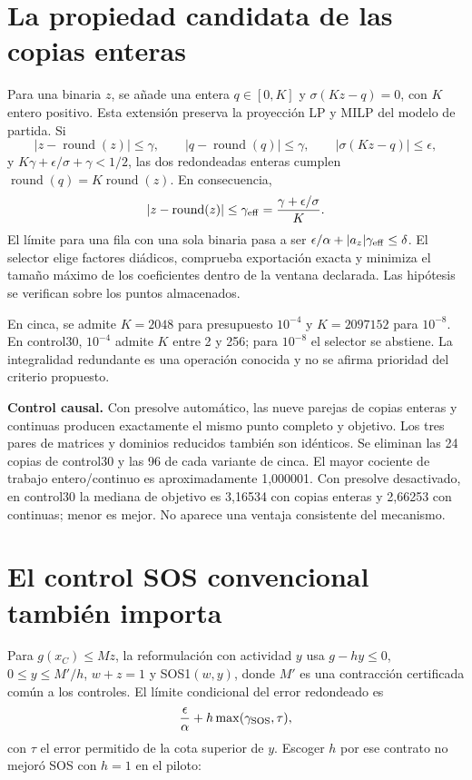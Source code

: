 \documentclass[10pt,a4paper]{article}
\begin{document}
\section*{La propiedad candidata de las copias enteras}
Para una binaria $z$, se añade una entera $q\in[0,K]$ y
$\sigma(Kz-q)=0$, con $K$ entero positivo. Esta extensión preserva la
proyección LP y MILP del modelo de partida. Si
\[
 |z-\operatorname{round}(z)|\leq\gamma,\qquad
 |q-\operatorname{round}(q)|\leq\gamma,\qquad
 |\sigma(Kz-q)|\leq\epsilon,
\]
y $K\gamma+\epsilon/\sigma+\gamma<1/2$, las dos redondeadas enteras cumplen
$\operatorname{round}(q)=K\operatorname{round}(z)$. En consecuencia,
\[
 |z-\operatorname{round}(z)|\leq
 \gamma_{\rm eff}=\frac{\gamma+\epsilon/\sigma}{K}.
\]
El límite para una fila con una sola binaria pasa a ser
$\epsilon/\alpha+|a_z|\gamma_{\rm eff}\leq\delta$.
El selector elige factores diádicos, comprueba exportación exacta y minimiza
el tamaño máximo de los coeficientes dentro de la ventana declarada.
Las hipótesis se verifican sobre los puntos almacenados.

En cinca, se admite $K=2048$ para presupuesto $10^{-4}$ y $K=2097152$
para $10^{-8}$. En control30, $10^{-4}$ admite $K$ entre 2 y 256; para
$10^{-8}$ el selector se abstiene. La integralidad redundante es una operación
conocida y no se afirma prioridad del criterio propuesto.

\textbf{Control causal.} Con presolve automático, las nueve parejas de
copias enteras y continuas producen exactamente el mismo punto completo y
objetivo. Los tres pares de matrices y dominios reducidos también son
idénticos. Se eliminan las 24 copias de control30 y las 96 de cada variante
de cinca. El mayor cociente de trabajo entero/continuo es aproximadamente
1,000001. Con presolve desactivado, en control30 la mediana de objetivo es
3,16534 con copias enteras y 2,66253 con continuas; menor es mejor.
No aparece una ventaja consistente del mecanismo.

\section*{El control SOS convencional también importa}
Para $g(x_C)\leq Mz$, la reformulación con actividad $y$ usa
$g-hy\leq0$, $0\leq y\leq M'/h$, $w+z=1$ y SOS1$(w,y)$, donde $M'$
es una contracción certificada común a los controles. El límite condicional
del error redondeado es
\[
 \frac{\epsilon}{\alpha}+h\max(\gamma_{\rm SOS},\tau),
\]
con $\tau$ el error permitido de la cota superior de $y$.
Escoger $h$ por ese contrato no mejoró SOS con $h=1$ en el piloto:
\end{document}
